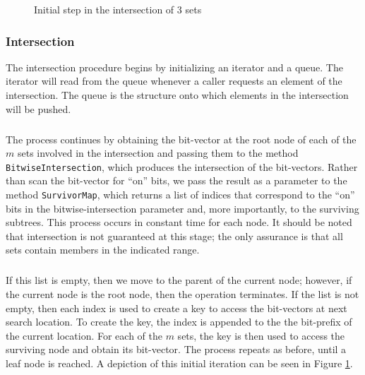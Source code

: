 \documentclass[11pt,letterpaper]{article}
\begin{document}
\begin{figure}[t]
\caption{Initial step in the intersection of 3 sets}
\label{fig:intersection-diagram}
\end{figure}

\subsubsection{Intersection}

The intersection procedure begins by initializing an iterator and a queue.
The iterator will read from the queue whenever a caller requests an
element of the intersection.  The queue is the structure onto which elements
in the intersection will be pushed.

\subparagraph{}
The process continues by obtaining the bit-vector at the root node
of each of the $m$ sets involved in the intersection and passing them to the
method {\tt BitwiseIntersection}, which produces the intersection of the bit-vectors.
Rather than scan the bit-vector for ``on'' bits, we pass the result as a parameter
to the method {\tt SurvivorMap}, which returns a list of indices that correspond
to the ``on'' bits in the bitwise-intersection parameter and, more importantly, to
the surviving subtrees.  This process occurs in constant time for each node.
It should be noted that intersection is not guaranteed at this stage; the only
assurance is that all sets contain members in the indicated range.

\subparagraph{}
If this list is empty, then we move to the parent of the
current node; however, if the current node is the root node, then the operation
terminates.
If the list is not empty, then each index is used to create a key to access the bit-vectors
at next search location.  To create the key, the index is appended to the the bit-prefix
of the current location.  For each of the $m$ sets, the key is then used to access
the surviving node and obtain its bit-vector.  The process repeats as before, until
a leaf node is reached.  A depiction of this initial iteration can be seen in
Figure \ref{fig:intersection-diagram}.
\end{document}

